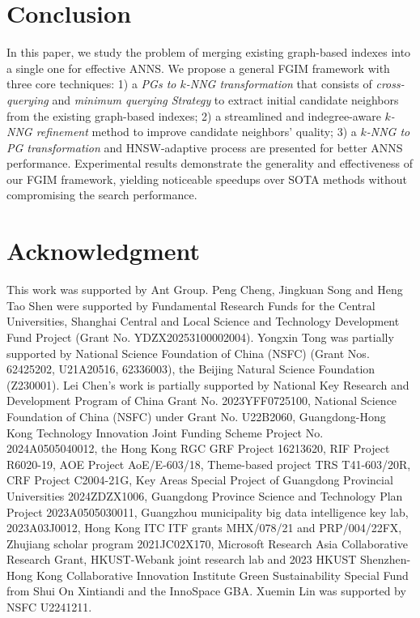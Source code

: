 \documentclass[acmsmall]{acmart}
\theoremstyle{remark}
\theoremstyle{definition}
\begin{document}
\section{Conclusion}
\label{sec:conclusion}

In this paper, we study the problem of merging existing graph-based indexes into a single one for effective ANNS. We propose a general FGIM framework with three core techniques: 1) a \textit{PGs to $k$-NNG transformation} that consists of \textit{cross-querying} and \textit{minimum querying Strategy} to extract initial candidate neighbors from the existing graph-based indexes; 2) a streamlined and indegree-aware \textit{$k$-NNG refinement} method to improve candidate neighbors' quality; 3) a \textit{$k$-NNG to PG transformation} and HNSW-adaptive process are presented for better ANNS performance. Experimental results demonstrate the generality and effectiveness of our FGIM framework, yielding noticeable speedups over SOTA methods without compromising the search performance.


\section{Acknowledgment}
\label{sec:ack}

This work was supported by Ant Group. Peng Cheng, Jingkuan Song and Heng Tao Shen were supported by Fundamental Research Funds for the Central Universities, Shanghai Central and Local Science and Technology Development Fund Project (Grant No. YDZX20253100002004).
Yongxin Tong was partially supported by National Science Foundation of China (NSFC) (Grant Nos. 62425202, U21A20516, 62336003), the Beijing Natural Science Foundation (Z230001). 
Lei Chen’s work is partially supported by National Key Research and Development Program of China Grant No. 2023YFF0725100, National Science Foundation of China (NSFC) under Grant No. U22B2060, Guangdong-Hong Kong Technology Innovation Joint Funding Scheme Project No. 2024A0505040012, the Hong Kong RGC GRF Project 16213620, RIF Project R6020-19, AOE Project AoE/E-603/18, Theme-based project TRS T41-603/20R, CRF Project C2004-21G, Key Areas Special Project of Guangdong Provincial  Universities 2024ZDZX1006,  Guangdong Province Science and Technology Plan Project 2023A0505030011, Guangzhou municipality big data intelligence key lab, 2023A03J0012, Hong Kong ITC ITF grants MHX/078/21 and PRP/004/22FX, Zhujiang scholar program 2021JC02X170, Microsoft Research Asia Collaborative Research Grant, HKUST-Webank joint research lab and 2023 HKUST Shenzhen-Hong Kong Collaborative Innovation Institute Green Sustainability Special Fund from Shui On Xintiandi and the InnoSpace GBA.
Xuemin Lin was supported by NSFC U2241211.

\newpage




\balance

\AtEndDocument{\label{TotPages}}
\end{document}
